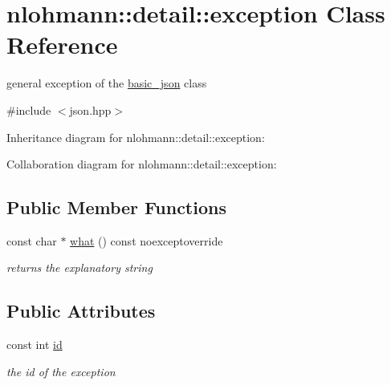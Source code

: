 \hypertarget{classnlohmann_1_1detail_1_1exception}{}\section{nlohmann\+:\+:detail\+:\+:exception Class Reference}
\label{classnlohmann_1_1detail_1_1exception}


general exception of the \hyperlink{classnlohmann_1_1basic__json}{basic\+\_\+json} class  




{\ttfamily \#include $<$json.\+hpp$>$}



Inheritance diagram for nlohmann\+:\+:detail\+:\+:exception\+:


Collaboration diagram for nlohmann\+:\+:detail\+:\+:exception\+:
\subsection*{Public Member Functions}
\begin{DoxyCompactItemize}
\item 
const char $\ast$ \hyperlink{classnlohmann_1_1detail_1_1exception_a56e006c6ac214875115049ae5b9b569a}{what} () const noexceptoverride\hypertarget{classnlohmann_1_1detail_1_1exception_a56e006c6ac214875115049ae5b9b569a}{}\label{classnlohmann_1_1detail_1_1exception_a56e006c6ac214875115049ae5b9b569a}

\begin{DoxyCompactList}\small\item\em returns the explanatory string \end{DoxyCompactList}\end{DoxyCompactItemize}
\subsection*{Public Attributes}
\begin{DoxyCompactItemize}
\item 
const int \hyperlink{classnlohmann_1_1detail_1_1exception_a0d4589a3fb54e81646d986c05efa3b9a}{id}\hypertarget{classnlohmann_1_1detail_1_1exception_a0d4589a3fb54e81646d986c05efa3b9a}{}\label{classnlohmann_1_1detail_1_1exception_a0d4589a3fb54e81646d986c05efa3b9a}

\begin{DoxyCompactList}\small\item\em the id of the exception \end{DoxyCompactList}\end{DoxyCompactItemize}
